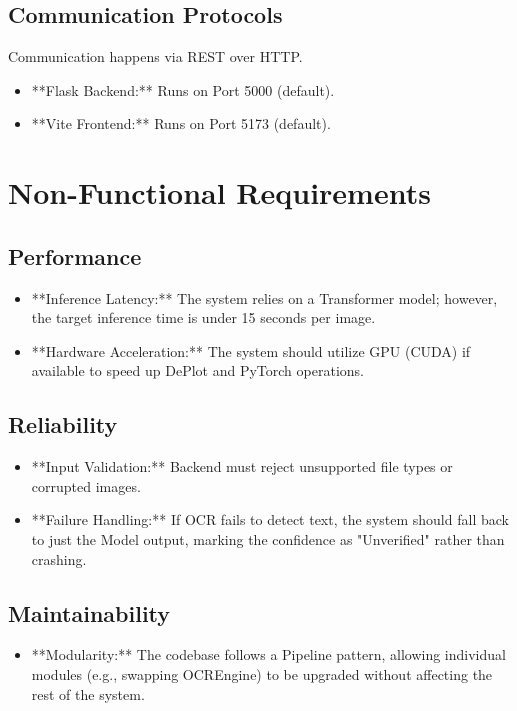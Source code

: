 \documentclass[12pt, a4paper]{article}
\begin{document}
\subsection{Communication Protocols}
Communication happens via REST over HTTP.
\begin{itemize}
    \item **Flask Backend:** Runs on Port 5000 (default).
    \item **Vite Frontend:** Runs on Port 5173 (default).
\end{itemize}

\section{Non-Functional Requirements}

\subsection{Performance}
\begin{itemize}
    \item **Inference Latency:** The system relies on a Transformer model; however, the target inference time is under 15 seconds per image.
    \item **Hardware Acceleration:** The system should utilize GPU (CUDA) if available to speed up DePlot and PyTorch operations.
\end{itemize}

\subsection{Reliability}
\begin{itemize}
    \item **Input Validation:** Backend must reject unsupported file types or corrupted images.
    \item **Failure Handling:** If OCR fails to detect text, the system should fall back to just the Model output, marking the confidence as "Unverified" rather than crashing.
\end{itemize}

\subsection{Maintainability}
\begin{itemize}
    \item **Modularity:** The codebase follows a Pipeline pattern, allowing individual modules (e.g., swapping OCREngine) to be upgraded without affecting the rest of the system.
\end{itemize}
\end{document}
